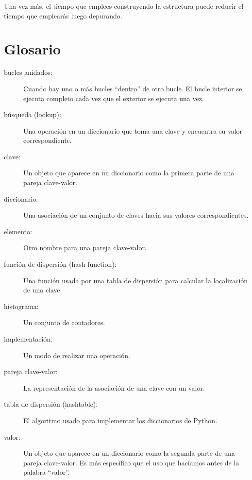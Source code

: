 Una vez más, el tiempo que emplees construyendo la estructura puede reducir
el tiempo que emplearás luego depurando.


\section{Glosario}

\begin{description}

\item[bucles anidados:] Cuando hay uno o más bucles ``dentro'' de
otro bucle. El bucle interior se ejecuta completo cada vez que el exterior
se ejecuta una vez.

\item[búsqueda (lookup):] Una operación en un diccionario que toma una clave
y encuentra su valor correspondiente.

\item[clave:] Un objeto que aparece en un diccionario como la
primera parte de una pareja clave-valor.

\item[diccionario:] Una asociación de un conjunto de claves hacia sus
valores correspondientes.

\item[elemento:] Otro nombre para una pareja clave-valor.

\item[función de dispersión (hash function):] Una función usada por una tabla de dispersión
para calcular la localización de una clave.

\item[histograma:] Un conjunto de contadores.

\item[implementación:] Un modo de realizar una operación.

\item[pareja clave-valor:] La representación de la asociación de
una clave con un valor.

\item[tabla de dispersión (hashtable):] El algoritmo usado para implementar
los diccionarios de Python.

\item[valor:] Un objeto que aparece en un diccionario como la
segunda parte de una pareja clave-valor. Es más específico que
el uso que hacíamos antes de la palabra ``valor''.

\end{description}

